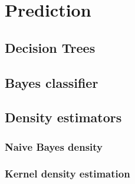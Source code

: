 \documentclass[10pt]{article}
\begin{document}
\newpage
\section{Prediction}
\newpage
\subsection{Decision Trees}
\newpage
\subsection{Bayes classifier}
\newpage
\subsection{Density estimators}
\subsubsection{Naive Bayes density}
\subsubsection{Kernel density estimation}
\end{document}
